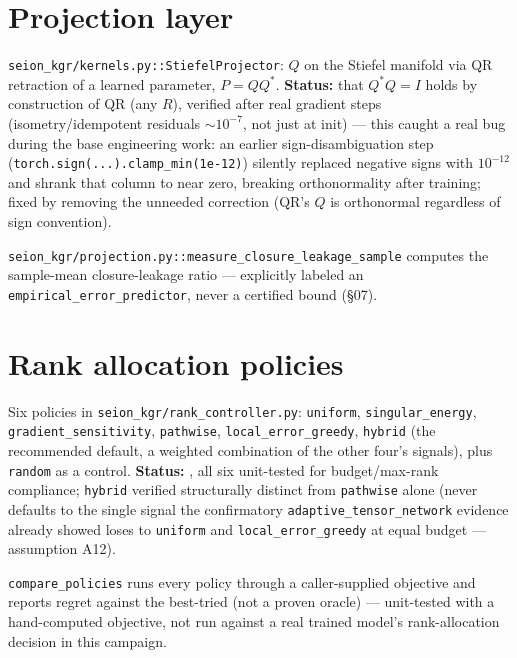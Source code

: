\documentclass[11pt]{article}
\begin{document}

\tableofcontents

\section{Projection layer}
\texttt{seion\_kgr/kernels.py::StiefelProjector}: $Q$ on the Stiefel manifold via QR retraction
of a learned parameter, $P = QQ^*$. \textbf{Status: \ProvedU} that $Q^*Q=I$ holds by construction
of QR (any $R$), verified after real gradient steps (isometry/idempotent residuals
$\sim10^{-7}$, not just at init) --- this caught a real bug during the base engineering work: an
earlier sign-disambiguation step (\texttt{torch.sign(...).clamp\_min(1e-12)}) silently replaced
negative signs with $10^{-12}$ and shrank that column to near zero, breaking orthonormality after
training; fixed by removing the unneeded correction (QR's $Q$ is orthonormal regardless of sign
convention).

\texttt{seion\_kgr/projection.py::measure\_closure\_leakage\_sample} computes the sample-mean
closure-leakage ratio --- explicitly labeled an \texttt{empirical\_error\_predictor}, never a
certified bound (\S07).

\section{Rank allocation policies}
Six policies in \texttt{seion\_kgr/rank\_controller.py}: \texttt{uniform},
\texttt{singular\_energy}, \texttt{gradient\_sensitivity}, \texttt{pathwise},
\texttt{local\_error\_greedy}, \texttt{hybrid} (the recommended default, a weighted combination of
the other four's signals), plus \texttt{random} as a control. \textbf{Status: \DefC}, all six
unit-tested for budget/max-rank compliance; \texttt{hybrid} verified structurally distinct from
\texttt{pathwise} alone (never defaults to the single signal the confirmatory
\texttt{adaptive\_tensor\_network} evidence already showed loses to \texttt{uniform} and
\texttt{local\_error\_greedy} at equal budget --- assumption A12).

\texttt{compare\_policies} runs every policy through a caller-supplied objective and reports
regret against the best-tried (not a proven oracle) --- unit-tested with a hand-computed objective,
not run against a real trained model's rank-allocation decision in this campaign.
\end{document}
